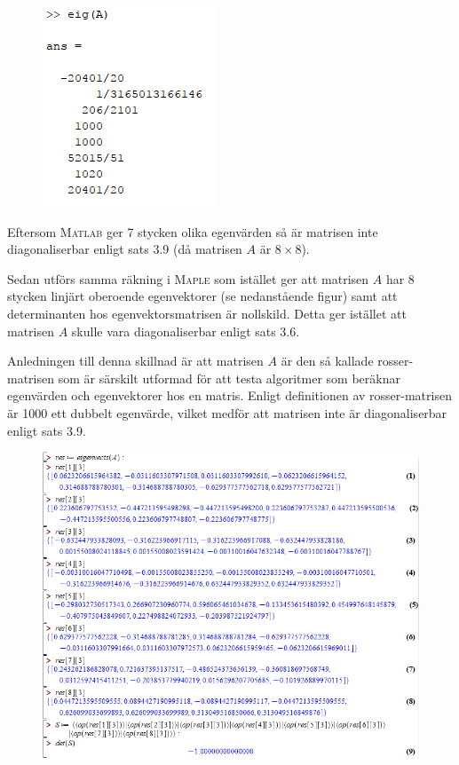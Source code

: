 \documentclass[a4paper]{article}
\newcommand{\mat}[1]{\bm{\mathit{#1}}}
\begin{document}
\FloatBarrier
\begin{figure}[h!]
  \centering
  \includegraphics[width=0.35\linewidth]{figurer/matlab_1_2_b.png}
\end{figure}
\FloatBarrier

\noindent Eftersom \textsc{Matlab} ger 7 stycken olika egenvärden så är matrisen
inte diagonaliserbar enligt sats 3.9 (då matrisen $\mat{A}$ är $8\times 8$).

Sedan utförs samma räkning i \textsc{Maple} som istället ger att matrisen
$\mat{A}$ har 8 stycken linjärt oberoende egenvektorer (se nedanstående figur)
samt att determinanten hos egenvektorsmatrisen är nollskild. Detta ger istället
att matrisen $\mat{A}$ skulle vara diagonaliserbar enligt sats 3.6.

Anledningen till denna skillnad är att matrisen $\mat{A}$ är den så kallade
rosser-matrisen som är särskilt utformad för att testa algoritmer som beräknar
egenvärden och egenvektorer hos en matris. Enligt definitionen av
rosser-matrisen är 1000 ett dubbelt egenvärde, vilket medför att matrisen inte
är diagonaliserbar enligt sats 3.9.

\FloatBarrier
\begin{figure}[h!]
  \centering
  \includegraphics[width=1.2\linewidth]{figurer/maple_1_2_b.png}
\end{figure}
\FloatBarrier
\end{document}
